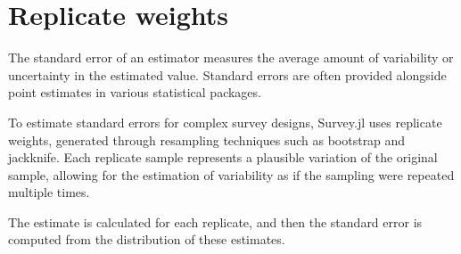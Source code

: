 \documentclass{juliacon}
\begin{document}

\section{Replicate weights}

The standard error of an estimator measures the average amount of variability or uncertainty in the estimated value. Standard errors are often provided alongside point estimates in various statistical packages.

To estimate standard errors for complex survey designs, Survey.jl uses replicate weights, generated through resampling techniques such as bootstrap and jackknife. Each replicate sample represents a plausible variation of the original sample, allowing for the estimation of variability as if the sampling were repeated multiple times.

The estimate is calculated for each replicate, and then the standard error is computed from the distribution of these estimates. 

\end{document}
